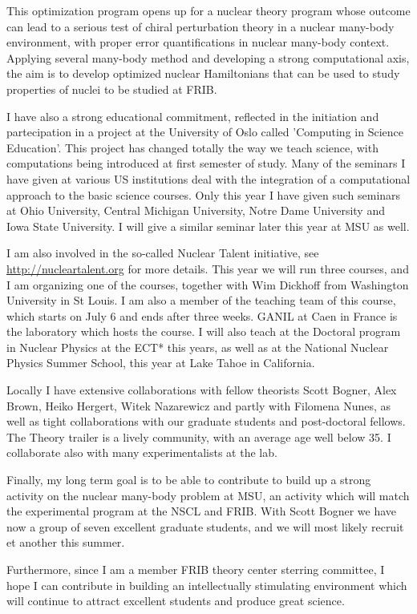 \documentclass[prc,amsart,english,twocolumn,superscriptaddress,showpacs,floatfix]{revtex4}
\begin{document}
This optimization program opens up for a nuclear theory program whose outcome can lead to a serious test of chiral perturbation theory in a nuclear many-body environment,
with proper error quantifications in  nuclear many-body context.
Applying several many-body method and  developing a strong
computational axis, the aim is to develop optimized nuclear Hamiltonians that can be used to study properties of nuclei to be studied at FRIB. 

I have also a strong educational commitment, reflected in the initiation and partecipation in a project at the University of Oslo called 'Computing in Science Education'. This project has changed totally the way we teach science, with computations being introduced at first semester of study. Many of the seminars I have given at various US institutions deal with the integration of a computational approach to the basic science courses. Only this year I have given such seminars at Ohio University, Central Michigan University, Notre Dame University and Iowa State University. I will give a similar seminar later this year at MSU as well.

I am also involved in the so-called Nuclear Talent initiative, see \url{http://nucleartalent.org} for more details. 
This year we will run three courses,  and I am organizing one of the courses, together with Wim Dickhoff from Washington University in St Louis. 
I am also a member of the teaching team of this course, which starts  on July 6 and ends after three weeks. GANIL at Caen in France is the laboratory which hosts the course.
I will also teach at the Doctoral program in Nuclear Physics at the ECT* this years, as well as at the National Nuclear Physics Summer School, this year at Lake Tahoe in California.

Locally I have extensive collaborations with fellow theorists Scott Bogner, Alex Brown, Heiko Hergert, Witek Nazarewicz and partly with Filomena Nunes, as well as tight collaborations with our graduate students and post-doctoral fellows. The Theory trailer is a lively community, with an average age well below 35. I collaborate also 
with many experimentalists at the lab. 

Finally, my long term goal is to be able to contribute to build up a
strong activity on the nuclear many-body problem at MSU, an activity
which will match the experimental program at the NSCL and FRIB. With
Scott Bogner we have now a group of seven excellent graduate students, and we will most likely recruit et another this summer.

Furthermore, since I am a member FRIB theory center sterring
committee, I hope I can contribute in building an intellectually
stimulating environment which will continue to attract excellent
students and produce great science.


 
\end{document}
